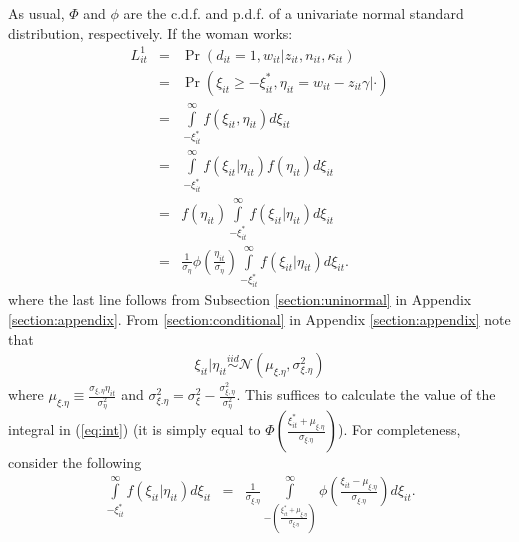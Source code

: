 \begin{exercise}
\noindent As usual, $\Phi$ and $\phi$ are the c.d.f. and p.d.f. of a univariate normal standard distribution, respectively. If the woman works: 
\begin{eqnarray}
L_{it}^1 &=& \Pr \left( d_{it} = 1 , w_{it} | z_{it}, n_{it}, \kappa_{it} \right) \nonumber \\
       &=& \Pr \left( \xi_{it} \geq - \xi_{it}^{*}, \eta_{it} = w_{it} - z_{it} \gamma | \cdot \right) \nonumber \nonumber \\
       &=& \int \limits _{-\xi_{it}^{*}} ^{\infty} f \left( \xi_{it}, \eta_{it} \right) d \xi_{it} \nonumber \\
       &=& \int \limits _{-\xi_{it}^{*}} ^{\infty} f \left( \xi_{it} | \eta_{it} \right) f \left( \eta_{it} \right) d \xi_{it} \nonumber \\
       &=& f \left( \eta_{it} \right) \int \limits _{-\xi_{it}^{*}} ^{\infty} f \left( \xi_{it} | \eta_{it} \right) d \xi_{it} \nonumber \\
       &=& \frac{1}{\sigma_{\eta}} \phi \left( \frac{\eta_{it}}{\sigma_{\eta}} \right) \int \limits _{-\xi_{it}^{*}} ^{\infty} f \left( \xi_{it} | \eta_{it} \right) d \xi_{it} \label{eq:int}.
\end{eqnarray}
\noindent where the last line follows from Subsection \ref{section:uninormal} in Appendix \ref{section:appendix}. From \ref{section:conditional} in Appendix \ref{section:appendix} note that
\begin{eqnarray}
\xi_{it} | \eta_{it} \overset{iid}{\sim} \mathcal{N} \left( \mu_{\xi.\eta}, \sigma_{\xi.\eta}^2 \right)
\end{eqnarray}
\noindent where $\mu_{\xi.\eta} \equiv \frac{\sigma_{\xi, \eta} \eta_{it}}{\sigma_{\eta}^2}$ and $\sigma_{\xi.\eta}^2 = \sigma_{\xi}^2 - \frac{\sigma_{\xi,\eta}^2}{\sigma_{\eta}^2}$. This suffices to calculate the value of the integral in (\eqref{eq:int}) (it is simply equal to $\Phi \left(  \frac{\xi_{it}^* + \mu_{\xi.\eta}}{\sigma_{\xi.\eta}}\right)$). For completeness, consider the following
\begin{eqnarray}
\int \limits _{-\xi_{it}^{*}} ^{\infty} f \left( \xi_{it} | \eta_{it} \right) d \xi_{it} &=& \frac{1}{\sigma_{\xi.\eta}} \int \limits _{-  \left( \frac{\xi_{it}^{*} + \mu_{\xi.\eta}}{\sigma_{\xi.\eta}}  \right) } ^{\infty} \phi \left( \frac{\xi_{it} - \mu_{\xi.\eta}}{\sigma_{\xi.\eta}}  \right) d\xi_{it}. \nonumber \\
\end{eqnarray}


\end{exercise}
